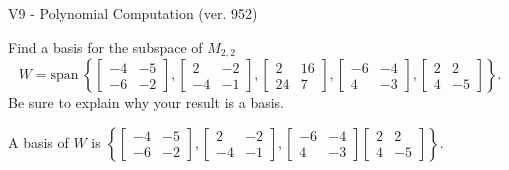 \begin{exercise}
  \begin{exerciseTitle}V9 - Polynomial Computation (ver. 952)\end{exerciseTitle}
  \begin{exerciseStatement}
    Find a basis for the subspace of \(M_{2,2}\) 
\[W=\mathrm{span}\ \left\{\left[\begin{array}{cc}
-4 & -5 \\
-6 & -2
\end{array}\right] , \left[\begin{array}{cc}
2 & -2 \\
-4 & -1
\end{array}\right] , \left[\begin{array}{cc}
2 & 16 \\
24 & 7
\end{array}\right] , \left[\begin{array}{cc}
-6 & -4 \\
4 & -3
\end{array}\right] , \left[\begin{array}{cc}
2 & 2 \\
4 & -5
\end{array}\right]\right\}.\]
 Be sure to explain why your result is a basis.


  \end{exerciseStatement}
  \begin{exerciseAnswer}
   A basis of \(W\) is  \(\left\{\left[\begin{array}{cc}
-4 & -5 \\
-6 & -2
\end{array}\right] , \left[\begin{array}{cc}
2 & -2 \\
-4 & -1
\end{array}\right] , \left[\begin{array}{cc}
-6 & -4 \\
4 & -3
\end{array}\right] \left[\begin{array}{cc}
2 & 2 \\
4 & -5
\end{array}\right]\right\}\).
  


  \end{exerciseAnswer}
\end{exercise}